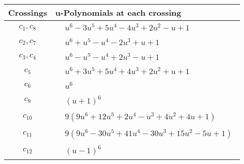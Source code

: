 \documentclass[1p]{elsarticle_modified}
\theoremstyle{definition}
\begin{document}
\begin{tabular}{m{50pt}|m{274pt}}
Crossings & \hspace{64pt}u-Polynomials at each crossing \\
\hline $$\begin{aligned}c_{1},c_{8}\end{aligned}$$&$\begin{aligned}
&u^6-3 u^5+5 u^4-4 u^3+2 u^2- u+1
\end{aligned}$\\
\hline $$\begin{aligned}c_{2},c_{7}\end{aligned}$$&$\begin{aligned}
&u^6+u^5- u^4-2 u^3+u+1
\end{aligned}$\\
\hline $$\begin{aligned}c_{3},c_{4}\end{aligned}$$&$\begin{aligned}
&u^6- u^5- u^4+2 u^3- u+1
\end{aligned}$\\
\hline $$\begin{aligned}c_{5}\end{aligned}$$&$\begin{aligned}
&u^6+3 u^5+5 u^4+4 u^3+2 u^2+u+1
\end{aligned}$\\
\hline $$\begin{aligned}c_{6}\end{aligned}$$&$\begin{aligned}
&u^6
\end{aligned}$\\
\hline $$\begin{aligned}c_{9}\end{aligned}$$&$\begin{aligned}
&(u+1)^6
\end{aligned}$\\
\hline $$\begin{aligned}c_{10}\end{aligned}$$&$\begin{aligned}
&9(9 u^6+12 u^5+2 u^4- u^3+4 u^2+4 u+1)
\end{aligned}$\\
\hline $$\begin{aligned}c_{11}\end{aligned}$$&$\begin{aligned}
&9(9 u^6-30 u^5+41 u^4-30 u^3+15 u^2-5 u+1)
\end{aligned}$\\
\hline $$\begin{aligned}c_{12}\end{aligned}$$&$\begin{aligned}
&(u-1)^6
\end{aligned}$\\
\hline
\end{tabular}\\~\\
\end{document}
